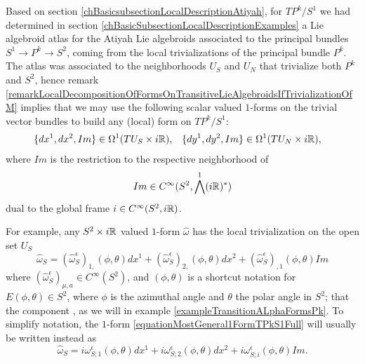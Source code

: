 \begin{example}[$TP^k/S^1$ over $S^2$]\label{exampleFormsTPkBuildingBLocksandMostGeneral1FormOn}
Based on section \ref{chBasicsubsectionLocalDescriptionAtiyah}, for $TP^k/S^1$ we had determined in section \ref{chBasicSubsectionLocalDescriptionExamples} a Lie algebroid atlas for the Atiyah Lie algebroids associated to the principal bundles $S^1 \to P^k \to S^2$, coming from the local trivializations of the principal bundle $P^k$. The atlas was associated to the neighborhoods $U_S$ and $U_N$ that trivialize both $P^k$ and $S^2$, hence remark \ref{remarkLocalDecompositionOfFormsOnTransitiveLieAlgebroidsIfTrivializationOfM} implies that we may use the following scalar valued $1$-forms on the trivial vector bundles to build any (local) form on $TP^k/S^1$:
\begin{align}
    \{dx^1, dx^2, Im\} &\in \Omega^1(TU_S \times i\mathbb{R}), &
    \{dy^1, dy^2, Im\} &\in \Omega^1(TU_N \times i\mathbb{R}),
\end{align}
where $Im$ is the restriction to the respective neighborhood of 
\begin{equation}\label{equationDefinitionImS2TPkAsForm}
    Im \in C^\infty(S^2, \bigwedge^1 (i\mathbb{R})^*)
\end{equation} 
dual to the global frame $i \in C^\infty(S^2, i\mathbb{R})$.

For example, any $S^2 \times i\mathbb{R}$ valued $1$-form $\hat \omega$ has the local trivialization on the open set $U_S$
\begin{equation}\label{equationMostGeneral1FormTPkS1Full}
    \hat \omega_S = (\hat \omega^\epsilon_{S})_{1,}(\phi, \theta) dx^1 + (\hat \omega^\epsilon_{S})_{2,}(\phi, \theta) dx^2 + (\hat \omega^\epsilon_{S})_{,1}(\phi, \theta) Im
\end{equation}
where $(\hat \omega^{\epsilon}_{S})_{\mu,  a} \in C^\infty(S^2)$, and $(\phi, \theta)$ is a shortcut notation for $E(\phi, \theta) \in S^2$, where $\phi$ is the azimuthal angle and $\theta$ the polar angle in $S^2$; that the component , as we will in example \ref{exampleTransitionALphaFormsPk}. 
To simplify notation, the $1$-form \eqref{equationMostGeneral1FormTPkS1Full} will usually be written instead as
\begin{equation}\label{equationMostGeneral1FormTPkS1Simplified}
    \hat \omega_S = i\omega^\epsilon_{S; 1}(\phi, \theta) dx^1 + i\omega^\epsilon_{S; 2}(\phi, \theta) dx^2 + i\omega^\epsilon_{S; i}(\phi, \theta) Im.
\end{equation}


\end{example}
